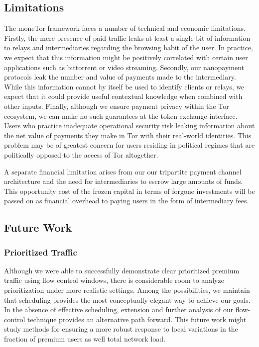 \subsection{Limitations}
\label{subsec:limitations}

The moneTor framework faces a number of technical and economic
limitations. Firstly, the mere presence of paid traffic leaks at least a single
bit of information to relays and intermediaries regarding the browsing habit of
the user. In practice, we expect that this information might be positively
correlated with certain user applications such as bittorrent or video
streaming. Secondly, our nanopayment protocols leak the number and value of
payments made to the intermediary. While this information cannot by itself be
used to identify clients or relays, we expect that it could provide useful
contextual knowledge when combined with other inputs. Finally, although we
ensure payment privacy within the Tor ecosystem, we can make no such guarantees
at the token exchange interface. Users who practice inadequate operational
security risk leaking information about the net value of payments they make in
Tor with their real-world identities. This problem may be of greatest concern for
users residing in political regimes that are politically opposed to the access
of Tor altogether.

A separate financial limitation arises from our our tripartite payment channel
architecture and the need for intermediaries to escrow large amounts of
funds. This opportunity cost of the frozen capital in terms of forgone
investments will be passed on as financial overhead to paying users in the form
of intermediary fees.

\subsection{Future Work}
\label{subsec:future_work}

\subsubsection{Prioritized Traffic} Although we were able to successfully demonstrate
clear prioritized premium traffic using flow control windows, there is
considerable room to analyze prioritization under more realistic settings. Among
the possibilities, we maintain that scheduling provides the most conceptually
elegant way to achieve our goals. In the absence of effective scheduling,
extension and further analysis of our flow-control technique provides an
alternative path forward. This future work might study methods for ensuring a
more robust response to local variations in the fraction of premium users as
well total network load.

